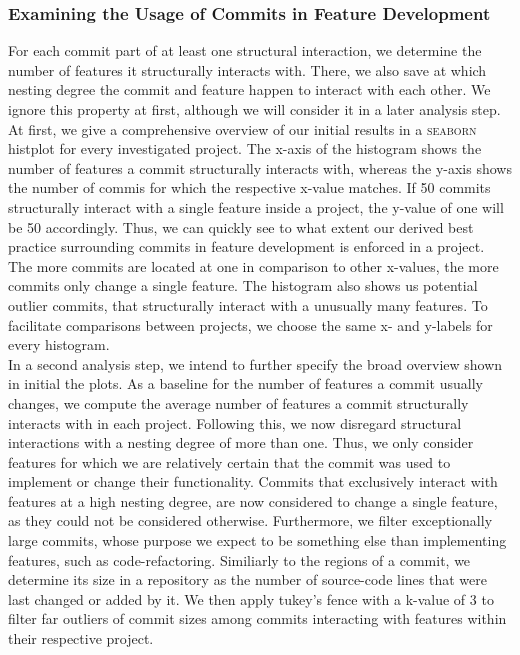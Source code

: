 \subsubsection*{Examining the Usage of Commits in Feature Development}

For each commit part of at least one structural interaction, we determine the number of features it structurally interacts with.
There, we also save at which nesting degree the commit and feature happen to interact with each other.
We ignore this property at first, although we will consider it in a later analysis step.
At first, we give a comprehensive overview of our initial results in a \textsc{seaborn} histplot for every investigated project.
The x-axis of the histogram shows the number of features a commit structurally interacts with, whereas the y-axis shows the number of commis for which the respective x-value matches.
If 50 commits structurally interact with a single feature inside a project, the y-value of one will be 50 accordingly.
Thus, we can quickly see to what extent our derived best practice surrounding commits in feature development is enforced in a project.
The more commits are located at one in comparison to other x-values, the more commits only change a single feature.
The histogram also shows us potential outlier commits, that structurally interact with a unusually many features.
To facilitate comparisons between projects, we choose the same x- and y-labels for every histogram. \\
In a second analysis step, we intend to further specify the broad overview shown in initial the plots.
As a baseline for the number of features a commit usually changes, we compute the average number of features a commit structurally interacts with in each project.
Following this, we now disregard structural interactions with a nesting degree of more than one. 
Thus, we only consider features for which we are relatively certain that the commit was used to implement or change their functionality.
Commits that exclusively interact with features at a high nesting degree, are now considered to change a single feature, as they could not be considered otherwise.
Furthermore, we filter exceptionally large commits, whose purpose we expect to be something else than implementing features, such as code-refactoring.
Similiarly to the regions of a commit, we determine its size in a repository as the number of source-code lines that were last changed or added by it.
We then apply tukey's fence with a k-value of 3 to filter far outliers of commit sizes among commits interacting with features within their respective project.
